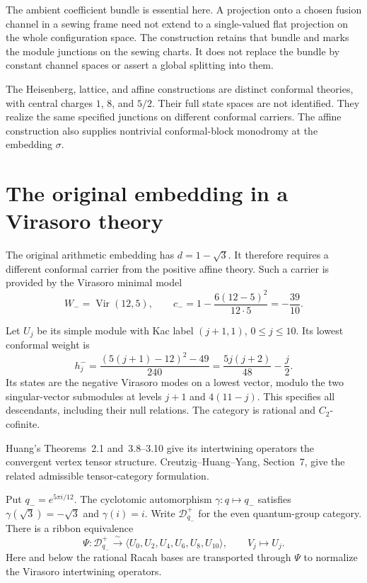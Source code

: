 The ambient coefficient bundle is essential here. A projection onto a
chosen fusion channel in a sewing frame need not extend to a
single-valued flat projection on the whole configuration space.
The construction retains that bundle and marks the module junctions
on the sewing charts. It does not replace the bundle by constant
channel spaces or assert a global splitting into them.

The Heisenberg, lattice, and affine constructions are distinct conformal
theories, with central charges $1$, $8$, and $5/2$. Their full state
spaces are not identified. They realize the same specified junctions
on different conformal carriers. The affine construction also supplies
nontrivial conformal-block monodromy at the embedding $\sigma$.

\section{The original embedding in a Virasoro theory}
\label{v4-arith:asi:sec:native-virasoro}

The original arithmetic embedding has $d=1-\sqrt3$. It therefore
requires a different conformal carrier from the positive affine theory.
Such a carrier is provided by the Virasoro minimal model
\[
 W_-=\operatorname{Vir}(12,5),\qquad
 c_-=1-\frac{6(12-5)^2}{12\cdot5}=-\frac{39}{10}.
\]


Let $U_j$ be its simple module with Kac label $(j+1,1)$,
$0\leq j\leq10$. Its lowest conformal weight is
\begin{equation}\label{v4-arith:asi:virasoro-weights}
 h_j^- =\frac{(5(j+1)-12)^2-49}{240}
       =\frac{5j(j+2)}{48}-\frac j2.
\end{equation}
Its states are the negative Virasoro modes on a lowest vector, modulo
the two singular-vector submodules at levels $j+1$ and $4(11-j)$.
This specifies all descendants, including their null relations.
The category is rational and \(C_2\)-cofinite.

Huang's Theorems~2.1 and~3.8--3.10 give its intertwining operators
the convergent vertex tensor structure.
Creutzig--Huang--Yang, Section~7, give the related admissible
tensor-category formulation.

Put $q_-=e^{5\pi i/12}$. The cyclotomic automorphism
$\gamma:q\mapsto q_-$ satisfies
$\gamma(\sqrt3)=-\sqrt3$ and $\gamma(i)=i$.
Write $\mathcal D_{q_-}^+$ for the even quantum-group category.
There is a ribbon equivalence
\begin{equation}\label{v4-arith:asi:virasoro-ribbon}
 \Psi:\mathcal D_{q_-}^+\xrightarrow{\ \sim\ }
                   \langle U_0,U_2,U_4,U_6,U_8,U_{10}\rangle,
 \qquad V_j\longmapsto U_j.
\end{equation}
Here and below the rational Racah bases are transported through
$\Psi$ to normalize the Virasoro intertwining operators.

